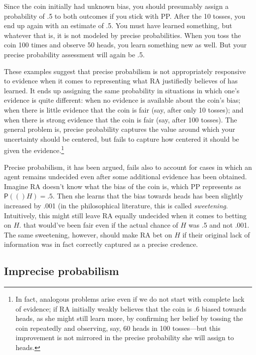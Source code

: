 \documentclass[
  10pt,
  dvipsnames,enabledeprecatedfontcommands]{scrartcl}
\newcommand{\pr}[1]{\mathsf{P}(#1)}
\begin{document}
\noindent Since the coin initially had unknown bias, you should
presumably assign a probability of .5 to both outcomes if you stick with
\textsf{PP}. After the 10 tosses, you end up again with an estimate of
.5. You must have learned something, but whatever that is, it is not
modeled by precise probabilities. When you toss the coin 100 times and
observe 50 heads, you learn something new as well. But your precise
probability assessment will again be .5.

These examples suggest that precise probabilism is not appropriately
responsive to evidence when it comes to representing what RA justifiedly
believes of has learned. It ends up assigning the same probability in
situations in which one's evidence is quite different: when no evidence
is available about the coin's bias; when there is little evidence that
the coin is fair (say, after only 10 tosses); and when there is strong
evidence that the coin is fair (say, after 100 tosses). The general
problem is, precise probability captures the value around which your
uncertainty should be centered, but fails to capture how centered it
should be given the evidence.\footnote{In fact, analogous problems arise
  even if we do not start with complete lack of evidence; if RA
  initially weakly believes that the coin is .6 biased towards heads, as
  she might still learn more, by confirming her belief by tossing the
  coin repeatedly and observing, say, 60 heads in 100 tosses---but this
  improvement is not mirrored in the precise probability she will assign
  to heads.}

Precise probabilism, it has been argued, fails also to account for cases
in which an agent remains undecided even after some additional evidence
has been obtained. Imagine RA doesn't know what the bias of the coin is,
which PP represents as \(\pr(H)= .5\). Then she learns that the bias
towards heads has been slightly increased by .001 (in the philosophical
literature, this is called \emph{sweetening}. Intuitively, this might
still leave RA equally undecided when it comes to betting on \(H\). that
would've been fair even if the actual chance of \(H\) was .5 and not
.001. The same sweetening, however, should make RA bet on \(H\) if their
original lack of information was in fact correctly captured as a precise
credence.

\subsection{Imprecise probabilism}\label{imprecise-probabilism}
\end{document}
